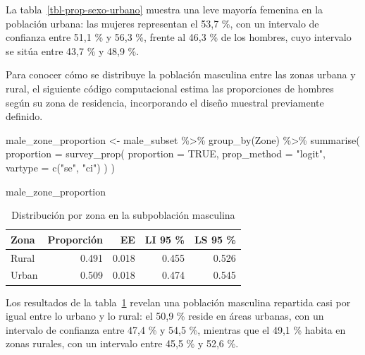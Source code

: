 \documentclass[
  spanish,
  11pt,
  letterpaper,
  oneside,
  open=any]{scrbook}
\newenvironment{Shaded}{\begin{snugshade}}{\end{snugshade}}
\newcommand{\AttributeTok}[1]{\textcolor[rgb]{0.40,0.45,0.13}{#1}}
\newcommand{\ConstantTok}[1]{\textcolor[rgb]{0.56,0.35,0.01}{#1}}
\newcommand{\FunctionTok}[1]{\textcolor[rgb]{0.28,0.35,0.67}{#1}}
\newcommand{\NormalTok}[1]{\textcolor[rgb]{0.00,0.23,0.31}{#1}}
\newcommand{\OtherTok}[1]{\textcolor[rgb]{0.00,0.23,0.31}{#1}}
\newcommand{\SpecialCharTok}[1]{\textcolor[rgb]{0.37,0.37,0.37}{#1}}
\newcommand{\StringTok}[1]{\textcolor[rgb]{0.13,0.47,0.30}{#1}}
\begin{document}
La tabla~\ref{tbl-prop-sexo-urbano} muestra una leve mayoría femenina en
la población urbana: las mujeres representan el 53,7 \%, con un
intervalo de confianza entre 51,1 \% y 56,3 \%, frente al 46,3 \% de los
hombres, cuyo intervalo se sitúa entre 43,7 \% y 48,9 \%.

Para conocer cómo se distribuye la población masculina entre las zonas
urbana y rural, el siguiente código computacional estima las
proporciones de hombres según su zona de residencia, incorporando el
diseño muestral previamente definido.

\begin{Shaded}
\begin{Highlighting}[]
\NormalTok{male\_zone\_proportion }\OtherTok{\textless{}{-}}\NormalTok{ male\_subset }\SpecialCharTok{\%\textgreater{}\%}
  \FunctionTok{group\_by}\NormalTok{(Zone) }\SpecialCharTok{\%\textgreater{}\%}
  \FunctionTok{summarise}\NormalTok{(}
    \AttributeTok{proportion =} \FunctionTok{survey\_prop}\NormalTok{(}
      \AttributeTok{proportion =} \ConstantTok{TRUE}\NormalTok{,}
      \AttributeTok{prop\_method =} \StringTok{"logit"}\NormalTok{,}
      \AttributeTok{vartype =} \FunctionTok{c}\NormalTok{(}\StringTok{"se"}\NormalTok{, }\StringTok{"ci"}\NormalTok{)}
\NormalTok{    )}
\NormalTok{  )}

\NormalTok{male\_zone\_proportion}
\end{Highlighting}
\end{Shaded}

{

\begin{longtable}[]{@{}lrrrr@{}}

\caption{\label{tbl-prop-zona-hombre}Distribución por zona en la
subpoblación masculina}

\tabularnewline

\toprule\noalign{}
Zona & Proporción & EE & LI 95 \% & LS 95 \% \\
\midrule\noalign{}
\endhead
\bottomrule\noalign{}
\endlastfoot
Rural & 0.491 & 0.018 & 0.455 & 0.526 \\
Urban & 0.509 & 0.018 & 0.474 & 0.545 \\

\end{longtable}

}

Los resultados de la tabla~\ref{tbl-prop-zona-hombre} revelan una
población masculina repartida casi por igual entre lo urbano y lo rural:
el 50,9 \% reside en áreas urbanas, con un intervalo de confianza entre
47,4 \% y 54,5 \%, mientras que el 49,1 \% habita en zonas rurales, con
un intervalo entre 45,5 \% y 52,6 \%.
\end{document}
